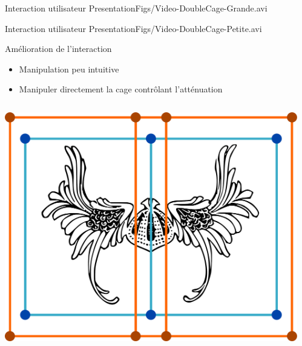 \documentclass[xcolor=x11names,compress]{beamer}
\renewcommand{\(}{\begin{columns}} \renewcommand{\)}{\end{columns}}
\newcommand{\<}[1]{\begin{column}{#1}} \renewcommand{\>}{\end{column}}
\begin{document}
\begin{frame}{Interaction utilisateur}
\centering
\movie[width=0.9\textwidth,height=0.5\paperwidth,poster,repeat,autostart,showcontrols=true]{}
{PresentationFigs/Video-DoubleCage-Grande.avi}
\end{frame}

\begin{frame}{Interaction utilisateur}
\centering
\movie[width=0.9\textwidth,height=0.5\paperwidth,poster,repeat,autostart,showcontrols=true]{}
{PresentationFigs/Video-DoubleCage-Petite.avi}
\end{frame}

\begin{frame}{Amélioration de l'interaction}
  \begin{itemize}
    \item Manipulation peu intuitive
    \item Manipuler directement la cage contrôlant l'atténuation
  \end{itemize}
  \begin{columns}[t]
    \begin{column}{0.5\textwidth}
      \centering
      \includegraphics[scale=0.15]{Deformation-Viking-Avant}
    \end{column}
    \begin{column}{0.5\textwidth}
      \centering

\end{column}
\end{columns}
\end{frame}
\end{document}
